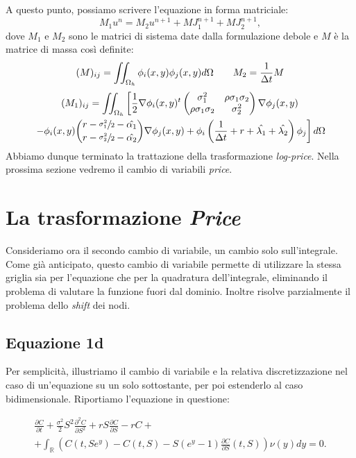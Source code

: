 \documentclass[a4paper,10pt]{report}
\newcommand{\der}[2]{\frac{\partial #1}{\partial #2}}
\newcommand{\dder}[2]{\frac{\partial^2 #1}{\partial #2^2}}
\theoremstyle{plain}
\theoremstyle{definition}
\theoremstyle{remark}
\begin{document}
A questo punto, possiamo scrivere l'equazione in forma matriciale: $$M_1u^n=M_2u^{n+1}+MJ_1^{n+1}+MJ_2^{n+1},$$dove $M_1$ e $M_2$ sono le matrici di sistema date dalla formulazione debole e $M$ \`e la matrice di massa cos\`i definite:
\begin{equation*}
 (M)_{ij}=\iint_{\Omega_h}\phi_i(x,y)\phi_j(x,y)d\Omega \qquad M_2=\frac{1}{\Delta t}M\\
\end{equation*}
\begin{multline*}
  (M_1)_{ij}=\iint_{\Omega_h} \left[ \frac{1}{2}\nabla\phi_i(x,y)^t\left(\begin{matrix}\sigma_1^2 & \rho\sigma_1\sigma_2\\ \rho\sigma_1\sigma_2 & \sigma_2^2 \end{matrix}\right)\nabla\phi_j(x,y)\right.\\
  \left.-\phi_i(x,y)\binom{r-\sfrac{\sigma_1^2}{2}-\hat{\alpha_1}}{r-\sfrac{\sigma_2^2}{2}-\hat{\alpha_2}}\nabla\phi_j(x,y)
  + \phi_i\left(\frac{1}{\Delta t}+r+\hat{\lambda_1}+\hat{\lambda_2}\right)\phi_j \right] d\Omega
\end{multline*}
Abbiamo dunque terminato la trattazione della trasformazione \emph{log-price}. Nella prossima sezione vedremo il cambio di variabili \emph{price}.


\section{La trasformazione \emph{Price}}
\label{sec:Price}
Consideriamo ora il secondo cambio di variabile, un cambio solo sull'integrale. Come già anticipato, questo cambio di variabile permette di utilizzare la stessa griglia sia per l'equazione che per la quadratura dell'integrale, eliminando il problema di valutare la funzione fuori dal dominio. Inoltre risolve parzialmente il problema dello \emph{shift} dei nodi.
\subsection{Equazione 1d}
Per semplicità, illustriamo il cambio di variabile e la relativa discretizzazione nel caso di un'equazione su un solo sottostante, per poi estenderlo al caso bidimensionale. Riportiamo l'equazione in questione:

\begin{multline*}
\label{eq:PIDE1d_will_price}
\der{C}{t}+\frac{\sigma^2}{2}S^2\dder{C}{S}+rS\der{C}{S}-rC+\\+ \int_\mathbb{R}\left(C(t,Se^y)-C(t,S)-S(e^y-1)\der{C}{S}(t,S)\right)\nu(y)dy=0.
\end{multline*}
\end{document}
